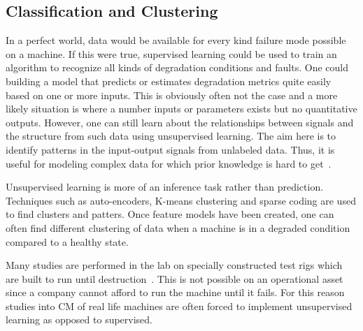 \documentclass[]{article}
\begin{document}
\subsection{Classification and Clustering}
In a perfect world, data would be available for every kind failure mode possible on a machine. If this were true, supervised learning could be used to train an algorithm to recognize all kinds of degradation conditions and faults. One could building a model that predicts or estimates degradation metrics quite easily based on one or more inputs. This is obviously often not the case and a more likely situation is where a number inputs or parameters exists but no quantitative outputs. However, one can still learn about the relationships between signals and the structure from such data using unsupervised learning. The aim here is to identify patterns in the input-output signals from unlabeled data. Thus, it is useful for modeling complex data for which prior knowledge is hard to get~\cite{martin2017unsupervised}.

Unsupervised learning is more of an inference task rather than prediction. Techniques such as auto-encoders, K-means clustering and sparse coding are used to find clusters and patters. Once feature models have been created, one can often find different clustering of data when a machine is in a degraded condition compared to a healthy state.

Many studies are performed in the lab on specially constructed test rigs which are built to run until destruction~\cite{soualhi2021novel, wang2016multiple, d2019physical, malhi2004pca}. This is not possible on an operational asset since a company cannot afford to run the machine until it fails. For this reason studies into \gls{CM} of real life machines are often forced to implement unsupervised learning as opposed to supervised.
\end{document}
